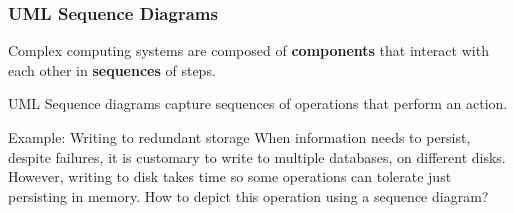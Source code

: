 \documentclass{beamer} %
\newcommand\emc[1]{\textcolor{brightblue}{\textbf{#1}}}
\begin{document}
\begin{frame}

\frametitle{UML Sequence Diagrams}

Complex computing systems are composed of \emc{components} that interact with each other in \emc{sequences} of steps. 

\vspace{3mm} UML Sequence diagrams capture sequences of operations that perform an action.

\begin{block}{Example: Writing to redundant storage}
When information needs to persist, despite failures, it is customary to write to multiple databases, on different disks. However, writing to disk takes time so some operations can tolerate just persisting in memory. How to depict this operation using a sequence diagram?
\end{block}

\end{frame}

\begin{frame}

\begin{center}
\end{center}

\end{frame}
\end{document}
